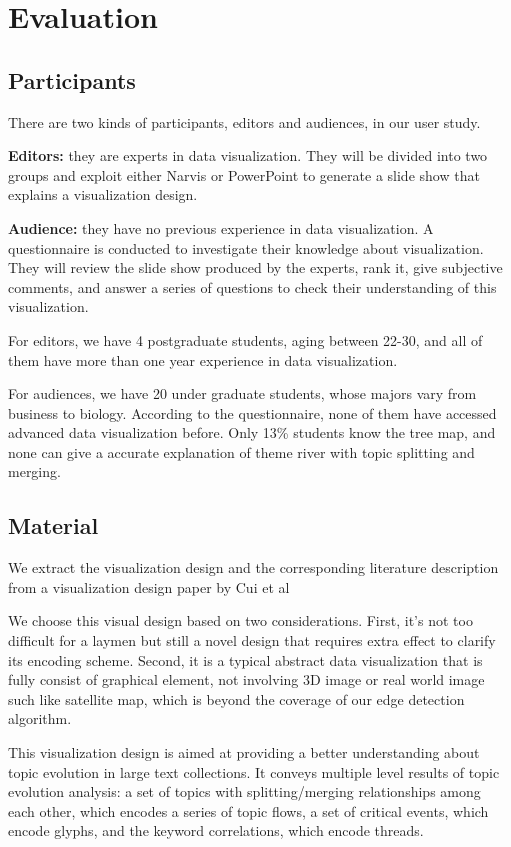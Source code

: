 \section{Evaluation}
\subsection{Participants}
There are two kinds of participants, editors and audiences,  in our user study.\par 
\textbf{Editors: }they are experts in data visualization. They will be divided into two groups and exploit either Narvis or PowerPoint to generate a slide show that explains a visualization design.  \par
\textbf{Audience: }they have no previous experience in data visualization. A questionnaire is conducted to investigate their knowledge about visualization. They will review the slide show produced by the experts, rank it, give subjective comments, and answer a series of questions to check their understanding of this visualization.\par
For editors, we have 4 postgraduate students, aging between 22-30, and all of them have more than one year experience in data visualization.\par
For audiences, we have 20 under graduate students, whose majors vary from business to biology. According to the questionnaire, none of them have accessed advanced data visualization before. Only 13\% students know the tree map, and none can give a accurate explanation of theme river with topic splitting and merging.  \par
\subsection{Material}
We extract the visualization design and the corresponding literature description from  a visualization design paper by Cui et al\cite{cui_textflow:_2011} \par
We choose this visual design based on two considerations. First, it's not too difficult for a laymen but still a novel design that requires extra effect to clarify its encoding scheme.
Second, it is a typical abstract data visualization that is fully consist of graphical element, not involving 3D image or real world image such like satellite map, which is beyond the coverage of our edge detection algorithm. \par
This visualization design is aimed at providing a better understanding about topic evolution in large text collections. It conveys multiple level results of topic evolution analysis: a set of topics
with splitting/merging relationships among each other, which encodes a series of topic flows, a set of critical events, which encode glyphs, and the keyword correlations, which encode threads.  \par

